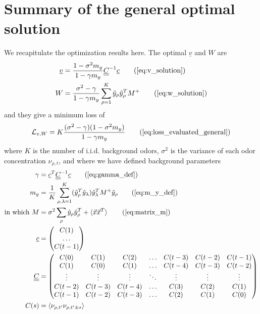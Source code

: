 \documentclass[letter, 12pt]{article}
\def\beq{ \begin{equation} }		%
\def\eeq{ \end{equation} } 			%
\newcommand{\dul}[1]{\underline{\underline{#1}}}
\begin{document}
\section{Summary of the general optimal solution}
\label{sec:summary}

We recapitulate the optimization results here. The optimal $\underline{v}$ and $W$ are
\begin{align}
	\underline{v} &= \frac{1 - \sigma^2 m_y }{1 - \gamma m_y} \dul{C}^{-1} \underline{c}  \tag{\ref{eq:v_solution}}  \\
	W &= \frac{\sigma^2 - \gamma}{1 - \gamma m_y} \sum_{\rho=1}^K \hat{y}_{\rho} \hat{y}_{\rho}^T M^+  \tag{\ref{eq:w_solution}}
\end{align}
and they give a minimum loss of
\beq
	\mathcal{L}_{v, W} = K \frac{(\sigma^2 - \gamma) (1 - \sigma^2 m_y)}{1 - \gamma m_y}  \tag{\ref{eq:loss_evaluated_general}}
\eeq
where $K$ is the number of i.i.d. background odors, $\sigma^2$ is the variance of each odor concentration $\nu_{\rho, t}$, and where we have defined background parameters
\begin{align}
	\gamma &= \underline{c}^T \dul{C}^{-1} \underline{c}	  \tag{\ref{eq:gamma_def}}  \\
	m_y &= \frac{1}{K} \sum_{\rho, \lambda=1}^K (\hat{y}_{\rho}^T \hat{y}_{\lambda}) \hat{y}_{\lambda}^T M^+ \hat{y}_{\rho}  \tag{\ref{eq:m_y_def}} \\
	\text{in which } M &= \sigma^2 \sum_{\rho} \hat{y}_{\rho} \hat{y}_{\rho}^T + \braket{\vec{x} \vec{x}^T} \tag{\ref{eq:matrix_m}} \\
	\underline{c} &= \begin{pmatrix}
		C(1) \\
		\ldots \\
		C(t-1)
	\end{pmatrix} \nonumber \\
	\dul{C} &= \begin{pmatrix}
		C(0) & C(1) & C(2) & \ldots & C(t-3) & C(t-2) & C(t-1) \\
		C(1) & C(0) & C(1) & \ldots & C(t-4) & C(t-3) & C(t-2) \\
		\vdots & \vdots & \vdots & \ddots  & \vdots & \vdots & \vdots \\
		C(t-2) & C(t-3) & C(t-4) & \ldots & C(3) & C(2) & C(1) \\
		C(t-1) & C(t-2) & C(t-3) & \ldots & C(2) & C(1) & C(0) \\
	\end{pmatrix} \nonumber \\
	C(s) &= \braket{\nu_{\rho, t'} \nu_{\rho, t' \pm s}} \nonumber \\
\end{align}
\end{document}
